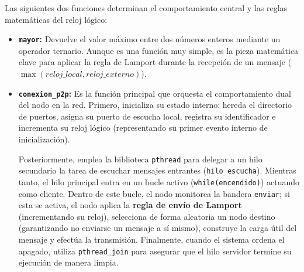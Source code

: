 Las siguientes dos funciones determinan el comportamiento central y las reglas matemáticas del reloj lógico:

\begin{itemize}
    \item \textbf{\texttt{mayor}:} Devuelve el valor máximo entre dos números enteros mediante un operador ternario. Aunque es una función muy simple, es la pieza matemática clave para aplicar la regla de Lamport durante la recepción de un mensaje ($ \max(reloj\_local, reloj\_externo) $).
    
    \item \textbf{\texttt{conexion\_p2p}:} Es la función principal que orquesta el comportamiento dual del nodo en la red. Primero, inicializa su estado interno: hereda el directorio de puertos, asigna su puerto de escucha local, registra su identificador e incrementa su reloj lógico (representando su primer evento interno de inicialización). 
    
    Posteriormente, emplea la biblioteca \texttt{pthread} para delegar a un hilo secundario la tarea de escuchar mensajes entrantes (\texttt{hilo\_escucha}). Mientras tanto, el hilo principal entra en un bucle activo (\texttt{while(encendido)}) actuando como cliente. Dentro de este bucle, el nodo monitorea la bandera \texttt{enviar}; si esta se activa, el nodo aplica la \textbf{regla de envío de Lamport} (incrementando su reloj), selecciona de forma aleatoria un nodo destino (garantizando no enviarse un mensaje a sí mismo), construye la carga útil del mensaje y efectúa la transmisión. Finalmente, cuando el sistema ordena el apagado, utiliza \texttt{pthread\_join} para asegurar que el hilo servidor termine su ejecución de manera limpia.
\end{itemize}


